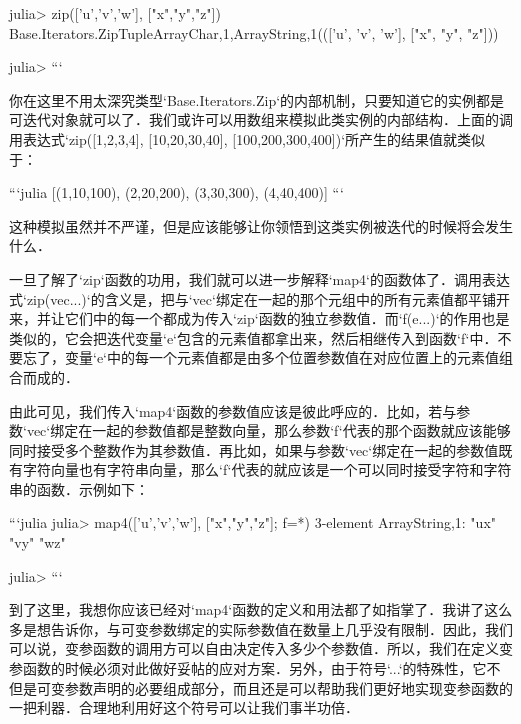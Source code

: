julia> zip(['u','v','w'], ["x","y","z"])
Base.Iterators.Zip{Tuple{Array{Char,1},Array{String,1}}}((['u', 'v', 'w'], ["x", "y", "z"]))

julia> 
```

你在这里不用太深究类型`Base.Iterators.Zip`的内部机制，只要知道它的实例都是可迭代对象就可以了．我们或许可以用数组来模拟此类实例的内部结构．上面的调用表达式`zip([1,2,3,4], [10,20,30,40], [100,200,300,400])`所产生的结果值就类似于：

```julia
[(1,10,100), (2,20,200), (3,30,300), (4,40,400)]
```

这种模拟虽然并不严谨，但是应该能够让你领悟到这类实例被迭代的时候将会发生什么．

一旦了解了`zip`函数的功用，我们就可以进一步解释`map4`的函数体了．调用表达式`zip(vec...)`的含义是，把与`vec`绑定在一起的那个元组中的所有元素值都平铺开来，并让它们中的每一个都成为传入`zip`函数的独立参数值．而`f(e...)`的作用也是类似的，它会把迭代变量`e`包含的元素值都拿出来，然后相继传入到函数`f`中．不要忘了，变量`e`中的每一个元素值都是由多个位置参数值在对应位置上的元素值组合而成的．

由此可见，我们传入`map4`函数的参数值应该是彼此呼应的．比如，若与参数`vec`绑定在一起的参数值都是整数向量，那么参数`f`代表的那个函数就应该能够同时接受多个整数作为其参数值．再比如，如果与参数`vec`绑定在一起的参数值既有字符向量也有字符串向量，那么`f`代表的就应该是一个可以同时接受字符和字符串的函数．示例如下：

```julia
julia> map4(['u','v','w'], ["x","y","z"]; f=*)
3-element Array{String,1}:
 "ux"
 "vy"
 "wz"

julia> 
```

到了这里，我想你应该已经对`map4`函数的定义和用法都了如指掌了．我讲了这么多是想告诉你，与可变参数绑定的实际参数值在数量上几乎没有限制．因此，我们可以说，变参函数的调用方可以自由决定传入多少个参数值．所以，我们在定义变参函数的时候必须对此做好妥帖的应对方案．另外，由于符号`...`的特殊性，它不但是可变参数声明的必要组成部分，而且还是可以帮助我们更好地实现变参函数的一把利器．合理地利用好这个符号可以让我们事半功倍．
